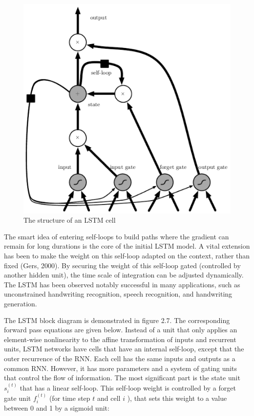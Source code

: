 \begin{figure}[H]
    \centering
    \includegraphics[scale=0.8]{./images/background/lstm.png}
    \caption{The structure of an LSTM cell}
    \label{fig:lstm}
\end{figure}

The smart idea of entering self-loops to build paths where the gradient can remain for long durations is the core of the initial LSTM model.
A vital extension has been to make the weight on this self-loop adapted on the context, rather than fixed (Gers, 2000).
By securing the weight of this self-loop gated (controlled by another hidden unit), the time scale of integration can be adjusted dynamically.
The LSTM has been observed notably successful in many applications, such as unconstrained handwriting recognition, speech recognition, and
handwriting generation.

The LSTM block diagram is demonstrated in figure 2.7.
The corresponding forward pass equations are given below.
Instead of a unit that only applies an element-wise nonlinearity to the affine transformation of inputs and recurrent units, LSTM networks have cells that have an internal self-loop,
except that the outer recurrence of the RNN\@.
Each cell has the same inputs and outputs as a common RNN\@.
However, it has more parameters and a system of gating units that control the flow of information.
The most significant part is the state unit $s^{(t)}_i$ that has a linear self-loop.
This self-loop weight is controlled by a forget gate unit $f^{(t)}_i$ (for time step $t$ and cell $i$ ), that sets this weight to a value between 0 and 1 by a sigmoid unit:

